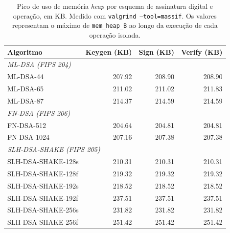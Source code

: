 \begin{table}[ht]
\centering
\caption{Pico de uso de memória \textit{heap} por esquema de assinatura
digital e operação, em KB.
Medido com \texttt{valgrind --tool=massif}.
Os valores representam o máximo de \texttt{mem\_heap\_B}
ao longo da execução de cada operação isolada.}
\label{tab:heap_sig}
\begin{tabular}{lrrr}
\toprule
\textbf{Algoritmo} & \textbf{Keygen (KB)} & \textbf{Sign (KB)} & \textbf{Verify (KB)} \\
\midrule
\multicolumn{4}{l}{\textit{ML-DSA (FIPS 204)}} \\[2pt]
\quad ML-DSA-44 & 207.92 & 208.90 & 208.90 \\
\quad ML-DSA-65 & 211.02 & 211.02 & 211.83 \\
\quad ML-DSA-87 & 214.37 & 214.59 & 214.59 \\
\midrule
\multicolumn{4}{l}{\textit{FN-DSA (FIPS 206)}} \\[2pt]
\quad FN-DSA-512  & 204.64 & 204.81 & 204.81 \\
\quad FN-DSA-1024 & 207.16 & 207.38 & 207.38 \\
\midrule
\multicolumn{4}{l}{\textit{SLH-DSA-SHAKE (FIPS 205)}} \\[2pt]
\quad SLH-DSA-SHAKE-128s & 210.31 & 210.31 & 210.31 \\
\quad SLH-DSA-SHAKE-128f & 219.32 & 219.32 & 219.32 \\
\quad SLH-DSA-SHAKE-192s & 218.52 & 218.52 & 218.52 \\
\quad SLH-DSA-SHAKE-192f & 237.51 & 237.51 & 237.51 \\
\quad SLH-DSA-SHAKE-256s & 231.82 & 231.82 & 231.82 \\
\quad SLH-DSA-SHAKE-256f & 251.42 & 251.42 & 251.42 \\
\bottomrule
\end{tabular}
\end{table}
